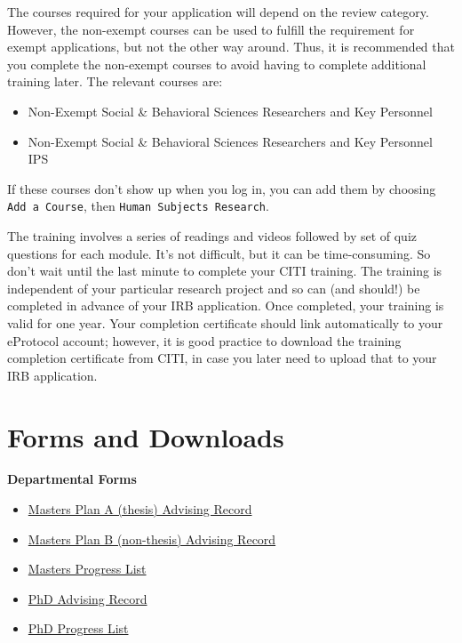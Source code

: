 \documentclass[
]{book}
\providecommand{\tightlist}{%
  \setlength{\itemsep}{0pt}\setlength{\parskip}{0pt}}
\begin{document}
The courses required for your application will depend on the review category. However, the non-exempt courses can be used to fulfill the requirement for exempt applications, but not the other way around. Thus, it is recommended that you complete the non-exempt courses to avoid having to complete additional training later. The relevant courses are:

\begin{itemize}
\tightlist
\item
  Non-Exempt Social \& Behavioral Sciences Researchers and Key Personnel
\item
  Non-Exempt Social \& Behavioral Sciences Researchers and Key Personnel IPS
\end{itemize}

If these courses don't show up when you log in, you can add them by choosing \texttt{Add\ a\ Course}, then \texttt{Human\ Subjects\ Research}.

The training involves a series of readings and videos followed by set of quiz questions for each module. It's not difficult, but it can be time-consuming. So don't wait until the last minute to complete your CITI training. The training is independent of your particular research project and so can (and should!) be completed in advance of your IRB application. Once completed, your training is valid for one year. Your completion certificate should link automatically to your eProtocol account; however, it is good practice to download the training completion certificate from CITI, in case you later need to upload that to your IRB application.

\hypertarget{forms}{%
\chapter{Forms and Downloads}\label{forms}}

\textbf{Departmental Forms}

\begin{itemize}
\tightlist
\item
  \href{docs/MA_PlanA_advising.pdf}{Masters Plan A (thesis) Advising Record}
\item
  \href{docs/MA_PlanB_advising.pdf}{Masters Plan B (non-thesis) Advising Record}
\item
  \href{docs/MA_progress_list.pdf}{Masters Progress List}
\item
  \href{docs/PhD_advising.pdf}{PhD Advising Record}
\item
  \href{docs/PhD_progress_list.pdf}{PhD Progress List}
\end{itemize}
\end{document}

